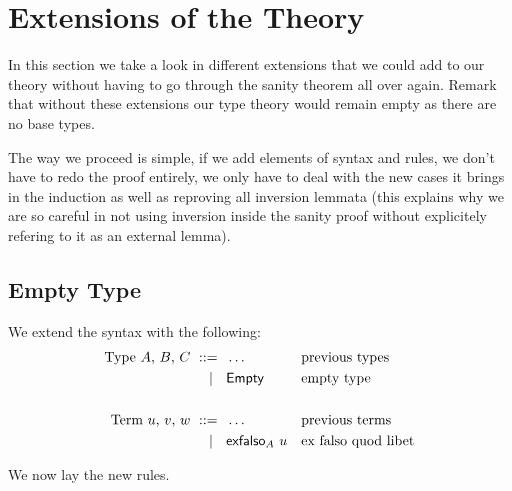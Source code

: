 \section{Extensions of the Theory}
\label{sec:extensions}

In this section we take a look in different extensions that we could add to
our theory without having to go through the sanity theorem all over again.
Remark that without these extensions our type theory would remain empty as there
are no base types.

The way we proceed is simple, if we add elements of syntax and rules, we don't
have to redo the proof entirely, we only have to deal with the new cases it
brings in the induction as well as reproving all inversion lemmata
(this explains why we are so careful in not using inversion inside the sanity
proof without explicitely refering to it as an external lemma).

\subsection{Empty Type}
\label{sec:empty-type}

We extend the syntax with the following:
%
\begin{align*}
  \text{Type $A$, $B$, $C$}
    \ \mathrel{{:}{:}{=}}\    {}& \ldots                   && \text{previous types}\\
    \ \mid\ \  {}& \mathsf{Empty}                   && \text{empty type} \\
  \\
  \text{Term $u$, $v$, $w$}
    \ \mathrel{{:}{:}{=}}\    {}& \ldots                   && \text{previous terms} \\
    \ \mid\ \  {}& \mathsf{exfalso}_{A}\  u         && \text{ex falso quod libet}
\end{align*}

We now lay the new rules.

\newcommand{\rlTyEmpty}{\referTo{ty-empty}{rul:ty-empty}}
\newcommand{\showTyEmpty}{%
  \infer[\rulename{ty-empty}] %
  {\isctx{\G}}
  {\istype{\G}{\Empty}}
}

\newcommand{\rlTermExfalso}{\referTo{term-exfalso}{rul:term-exfalso}}
\newcommand{\showTermExfalso}{%
\infer[\rulename{term-exfalso}] %
  {\istype{\G}{\A} \\
   \isterm{\G}{\uu}{\Empty}
  }
  {\isterm{\G}{\exfalso{\A} \uu}{\A}}
}

\newcommand{\rlEqTySubstEmpty}{\referTo{eq-ty-subst-empty}{rul:eq-ty-subst-empty}}
\newcommand{\showEqTySubstEmpty}{%
\infer[\rulename{eq-ty-subst-empty}] %
  {\issubst{\sbs}{\G}{\D}}
  {\eqtype{\G}{\subst{\Empty}{\sbs}}{\Empty}}
}

